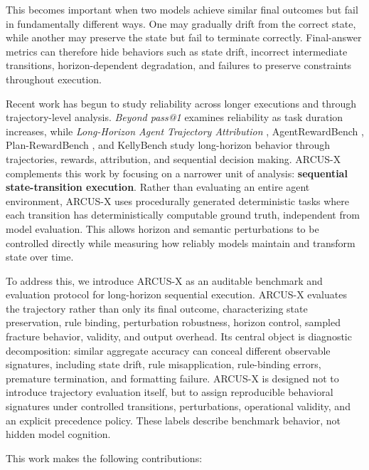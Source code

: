 \documentclass{article}
\begin{document}
This becomes important when two models achieve similar final outcomes but fail in fundamentally different ways. One may gradually drift from the correct state, while another may preserve the state but fail to terminate correctly. Final-answer metrics can therefore hide behaviors such as state drift, incorrect intermediate transitions, horizon-dependent degradation, and failures to preserve constraints throughout execution.

Recent work has begun to study reliability across longer executions and through trajectory-level analysis. \textit{Beyond pass@1} \cite{khanal2026pass1reliabilityscienceframework} examines reliability as task duration increases, while \textit{Long-Horizon Agent Trajectory Attribution} \cite{chen2026longhorizonagenttrajectoryattribution}, AgentRewardBench \cite{lu2025agentrewardbench}, Plan-RewardBench \cite{wang2026aligning}, and KellyBench \cite{grady2026kellybench} study long-horizon behavior through trajectories, rewards, attribution, and sequential decision making. ARCUS-X complements this work by focusing on a narrower unit of analysis: \textbf{sequential state-transition execution}. Rather than evaluating an entire agent environment, ARCUS-X uses procedurally generated deterministic tasks where each transition has deterministically computable ground truth, independent from model evaluation. This allows horizon and semantic perturbations to be controlled directly while measuring how reliably models maintain and transform state over time.

To address this, we introduce ARCUS-X as an auditable benchmark and evaluation protocol for long-horizon sequential execution. ARCUS-X evaluates the trajectory rather than only its final outcome, characterizing state preservation, rule binding, perturbation robustness, horizon control, sampled fracture behavior, validity, and output overhead. Its central object is diagnostic decomposition: similar aggregate accuracy can conceal different observable signatures, including state drift, rule misapplication, rule-binding errors, premature termination, and formatting failure. ARCUS-X is designed not to introduce trajectory evaluation itself, but to assign reproducible behavioral signatures under controlled transitions, perturbations, operational validity, and an explicit precedence policy. These labels describe benchmark behavior, not hidden model cognition.

This work makes the following contributions:
\end{document}
